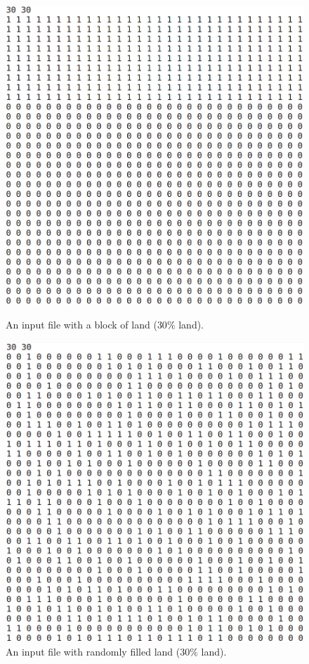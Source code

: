 \documentclass[12pt,a4paper]{article}
\begin{document}
\begin{figure}[ht]
\begin{minipage}[b]{0.475\linewidth}
\centering
\includegraphics[width=\textwidth]{img/input_file.png}
\caption{An input file with a block of land ($30\%$ land).}
\label{fig:1}
\end{minipage}
\hspace{0.5cm}
\begin{minipage}[b]{0.475\linewidth}
\centering
\includegraphics[width=\textwidth]{img/input_rand.png}
\caption{An input file with randomly filled land ($30\%$ land).}
\label{fig:2}
\end{minipage}
\end{figure}
\end{document}
